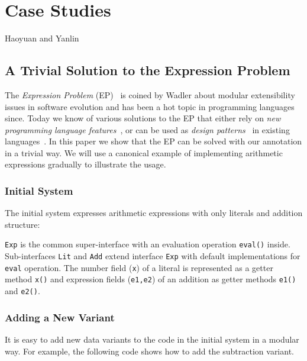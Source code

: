 \section{Case Studies}
Haoyuan and Yanlin

\subsection{A Trivial Solution to the Expression Problem}

The \emph{Expression Problem} (EP)~\cite{wadler98expression-problem} is coined
by Wadler about modular extensibility issues in software evolution and has been
a hot topic in programming languages since. Today we know of various solutions
to the EP that either rely on \emph{new programming language
  features}~\cite{chambers95multimethods,clifton00multiJava,madsen89virtual,nystrom06j,bruce98astatically,McDirmid01jiazzi,garrigue98polymorphic,zenger01extensible,loh06open,wehr11javaGI},
or can be used as \emph{design patterns}~\cite{gof} in existing
languages~\cite{torgersen04theexpression,oliveira06extensible,wouter08datatypes,oliveira09modular,oliveira12extensibility}. In
this paper we show that the EP can be solved with our \mixin annotation in a
trivial way. We will use a canonical example of implementing arithmetic
expressions gradually to illustrate the usage. 

\subsubsection{Initial System}
The initial system expresses arithmetic expressions with only literals and
addition structure:


\texttt{Exp} is the common super-interface with an evaluation operation
\texttt{eval()} inside. Sub-interfaces \texttt{Lit} and \texttt{Add} extend
interface \texttt{Exp} with default implementations for \texttt{eval}
operation. The number field (\texttt{x}) of a literal is represented as a getter
method \texttt{x()} and expression fields (\texttt{e1,e2}) of an addition as
getter methods \texttt{e1()} and \texttt{e2()}.

\subsubsection{Adding a New Variant}
It is easy to add new data variants to the code in the initial system in a
modular way. For example, the following code shows how to add the subtraction variant.


